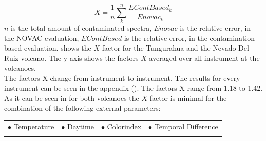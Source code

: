 \documentclass  [
  paper    = a4,
  BCOR     = 10mm,
  twoside,
  fontsize = 12pt,
  fleqn,
  toc      = bibnumbered,
  toc      = listofnumbered,
  numbers  = noendperiod,
  headings = normal,
  listof   = leveldown,
  version  = 3.03
]                                       {scrreprt}
\begin{document}
	\begin{equation}
	X = \frac{1}{n}\sum_{k}^{n} \frac{EContBased_{ k}}{Enovac_{ k}}
	\label{eq:mean}
	\end{equation}
	$n$ is the total amount of contaminated spectra, $Enovac$ is the relative   error, in the NOVAC-evaluation, $EContBased$ is the relative   error, in the contamination based-evaluation. 
	 shows the $X$ factor for the Tungurahua and the Nevado Del Ruiz volcano. The y-axis shows the factors $X$ averaged over all instrument at the volcanoes.\\
	The factors X change from instrument to instrument. The results for every instrument can be seen in the appendix (). The factors X range from 1.18 to 1.42.\\

	As it can be seen in   for both volcanoes the $X$ factor is minimal for the combination of the following external parameters:\\
	
	\begin{table}[h!]
			\begin{tabular}{cccc}
		$\bullet$ Temperature & $\bullet$ Daytime&  $\bullet$ Colorindex & $\bullet$ Temporal Difference\\
		\label{tab:importantexternalParam}
		\end{tabular}
	\end{table}
%	
\end{document}
